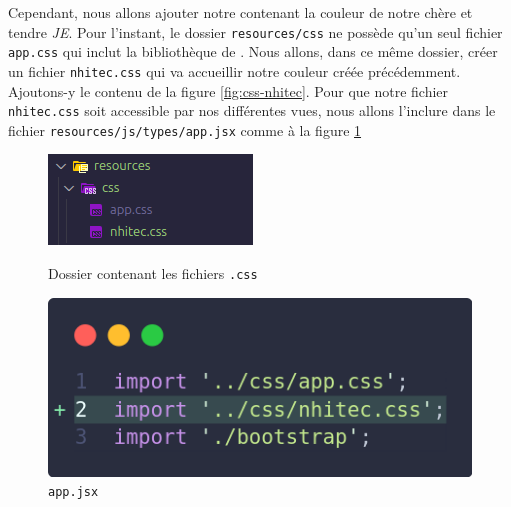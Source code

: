 Cependant, nous allons ajouter notre \css{} contenant la couleur de notre chère et tendre \textit{JE}. Pour l'instant, le dossier \texttt{resources/css} ne possède qu'un seul fichier \texttt{app.css} qui inclut la bibliothèque de \tailwind{}. Nous allons, dans ce même dossier, créer un fichier \texttt{nhitec.css} qui va accueillir notre couleur créée précédemment. Ajoutons-y le contenu de la figure \ref{fig:css-nhitec}. Pour que notre fichier \texttt{nhitec.css} soit accessible par nos différentes vues, nous allons l'inclure dans le fichier \texttt{resources/js/types/app.jsx} comme à la figure \ref{fig:include_css}

\begin{figure}[H]
    \centering
    \begin{minipage}[b]{0.34\linewidth}
        \centering
        \includegraphics[width=0.9\linewidth]{figures-C1/app.css_directory.png}
        \caption{Dossier contenant les fichiers \texttt{.css}}
        \label{fig:app.css_directory}
    \end{minipage}
    \hspace{0.04\linewidth}
    \begin{minipage}[b]{0.45\linewidth}
        \centering
        \includegraphics[width=0.9\linewidth]{figures-C1/include_css.png}
        \caption{\texttt{app.jsx}}
        \label{fig:include_css}
    \end{minipage}
\end{figure}





